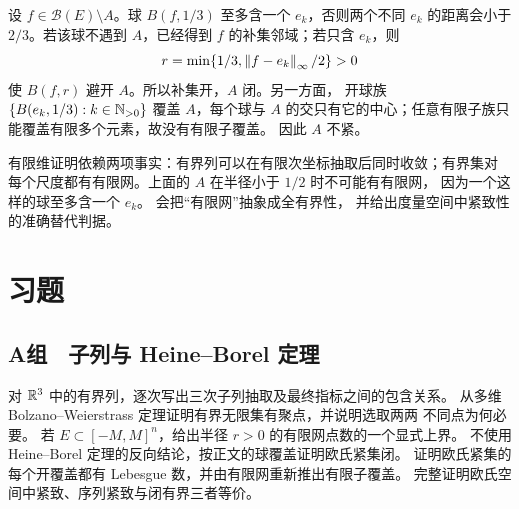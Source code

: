 设 \(f\in\mathcal B(E)\setminus A\)。球 \(B(f,1/3)\) 至多含一个
\(e_k\)，否则两个不同 \(e_k\) 的距离会小于 \(2/3\)。若该球不遇到
\(A\)，已经得到 \(f\) 的补集邻域；若只含 \(e_k\)，则
\[
 r=\min\{1/3,\left\lVert f-e_k\right\rVert_\infty/2\}>0
\]
使 \(B(f,r)\) 避开 \(A\)。所以补集开，\(A\) 闭。另一方面，
开球族 \(\{B(e_k,1/3):k\in\mathbb{N}_{>0}\}\) 覆盖 \(A\)，每个球与 \(A\)
的交只有它的中心；任意有限子族只能覆盖有限多个元素，故没有有限子覆盖。
因此 \(A\) 不紧。

有限维证明依赖两项事实：有界列可以在有限次坐标抽取后同时收敛；有界集对
每个尺度都有有限网。上面的 \(A\) 在半径小于 \(1/2\) 时不可能有有限网，
因为一个这样的球至多含一个 \(e_k\)。
会把“有限网”抽象成全有界性，
并给出度量空间中紧致性的准确替代判据。

\section*{习题}

\subsection*{A组　子列与 Heine--Borel 定理}
\begin{enumerate}[label=\textbf{\thechapter.\arabic*.}]
 对 \(\mathbb{R}^3\) 中的有界列，逐次写出三次子列抽取及最终指标之间的包含关系。
 从多维 Bolzano--Weierstrass 定理证明有界无限集有聚点，并说明选取两两
 不同点为何必要。
 若 \(E\subset[-M,M]^n\)，给出半径 \(r>0\) 的有限网点数的一个显式上界。
 不使用 Heine--Borel 定理的反向结论，按正文的球覆盖证明欧氏紧集闭。
 证明欧氏紧集的每个开覆盖都有 Lebesgue 数，并由有限网重新推出有限子覆盖。
 完整证明欧氏空间中紧致、序列紧致与闭有界三者等价。
\end{enumerate}

